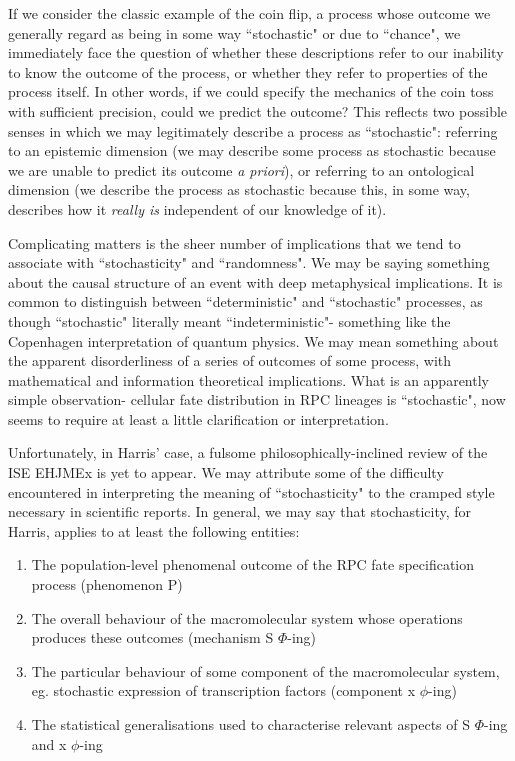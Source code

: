 If we consider the classic example of the coin flip, a process whose outcome we generally regard as being in some way ``stochastic" or due to ``chance", we immediately face the question of whether these descriptions refer to our inability to know the outcome of the process, or whether they refer to properties of the process itself. In other words, if we could specify the mechanics of the coin toss with sufficient precision, could we predict the outcome? This reflects two possible senses in which we may legitimately describe a process as ``stochastic": referring to an epistemic dimension (we may describe some process as stochastic because we are unable to predict its outcome \textit{a priori}), or referring to an ontological dimension (we describe the process as stochastic because this, in some way, describes how it \textit{really is} independent of our knowledge of it).

Complicating matters is the sheer number of implications that we tend to associate with ``stochasticity" and ``randomness". We may be saying something about the causal structure of an event with deep metaphysical implications. It is common to distinguish between ``deterministic" and ``stochastic" processes, as though ``stochastic" literally meant ``indeterministic"- something like the Copenhagen interpretation of quantum physics. We may mean something about the apparent disorderliness of a series of outcomes of some process, with mathematical and information theoretical implications. What is an apparently simple observation- cellular fate distribution in RPC lineages is ``stochastic", now seems to require at least a little clarification or interpretation.

Unfortunately, in Harris' case, a fulsome philosophically-inclined review of the ISE EHJMEx is yet to appear. We may attribute some of the difficulty encountered in interpreting the meaning of ``stochasticity" to the cramped style necessary in scientific reports. In general, we may say that stochasticity, for Harris, applies to at least the following entities:

\begin{enumerate}
\item The population-level phenomenal outcome of the RPC fate specification process (phenomenon P)
\item The overall behaviour of the macromolecular system whose operations produces these outcomes (mechanism S $\Phi$-ing)
\item The particular behaviour of some component of the macromolecular system, eg. stochastic expression of transcription factors (component x $\phi$-ing)
\item The statistical generalisations used to characterise relevant aspects of S $\Phi$-ing and x $\phi$-ing
\end{enumerate}

